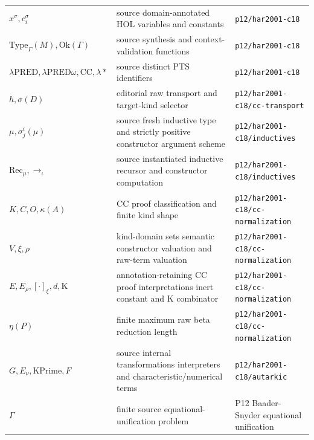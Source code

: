 \begin{longtable}{@{}p{}p{}p{}@{}}
\(x^\sigma,\allowbreak c_i^\sigma\) & source domain-annotated HOL variables and constants & \texttt{p12/\allowbreak{}har2001-\allowbreak{}c18} \\
\(\mathrm{Type}_\Gamma(M),\allowbreak \mathrm{Ok}(\Gamma)\) & source synthesis and context-validation functions & \texttt{p12/\allowbreak{}har2001-\allowbreak{}c18} \\
\(\lambda\mathrm{PRED},\allowbreak \lambda\mathrm{PRED}\omega,\allowbreak \mathrm{CC},\allowbreak \lambda\ast\) & source distinct PTS identifiers & \texttt{p12/\allowbreak{}har2001-\allowbreak{}c18} \\
\(h,\allowbreak \sigma(D)\) & editorial raw transport and target-kind selector & \texttt{p12/\allowbreak{}har2001-\allowbreak{}c18/\allowbreak{}cc-\allowbreak{}transport} \\
\(\mu,\allowbreak \sigma_j^i(\mu)\) & source fresh inductive type and strictly positive constructor argument scheme & \texttt{p12/\allowbreak{}har2001-\allowbreak{}c18/\allowbreak{}inductives} \\
\(\mathrm{Rec}_\mu,\allowbreak \to_\iota\) & source instantiated inductive recursor and constructor computation & \texttt{p12/\allowbreak{}har2001-\allowbreak{}c18/\allowbreak{}inductives} \\
\(K,\allowbreak C,\allowbreak O,\allowbreak \kappa(A)\) & CC proof classification and finite kind shape & \texttt{p12/\allowbreak{}har2001-\allowbreak{}c18/\allowbreak{}cc-\allowbreak{}normalization} \\
\(V,\allowbreak \xi,\allowbreak \rho\) & kind-domain sets semantic constructor valuation and raw-term valuation & \texttt{p12/\allowbreak{}har2001-\allowbreak{}c18/\allowbreak{}cc-\allowbreak{}normalization} \\
\(E,\allowbreak E_\rho,\allowbreak [\cdot]_\xi,\allowbreak d,\allowbreak \mathrm K\) & annotation-retaining CC proof interpretations inert constant and K combinator & \texttt{p12/\allowbreak{}har2001-\allowbreak{}c18/\allowbreak{}cc-\allowbreak{}normalization} \\
\(\eta(P)\) & finite maximum raw beta reduction length & \texttt{p12/\allowbreak{}har2001-\allowbreak{}c18/\allowbreak{}cc-\allowbreak{}normalization} \\
\(G,\allowbreak E_\nu,\allowbreak \mathrm{KPrime},\allowbreak F\) & source internal transformations interpreters and characteristic/numerical terms & \texttt{p12/\allowbreak{}har2001-\allowbreak{}c18/\allowbreak{}autarkic} \\
\(\Gamma\) & finite source equational-unification problem & P12 Baader-\allowbreak{}Snyder equational unification \\

\end{longtable}
